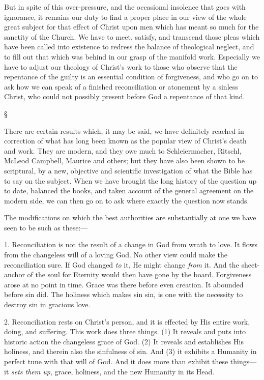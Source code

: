 \documentclass[12pt,letterpaper,oneside]{book}
\begin{document}
But in spite of this over-pressure, and the 
occasional insolence that goes with ignorance, 
it remains our duty to find a proper place in 
our view of the whole great subject for that 
effect of Christ upon men which has meant so 
much for the sanctity of the Church. We have 
to meet, satisfy, and transcend those pleas which 
have been called into existence to redress the 
balance of theological neglect, and to fill out 
that which was behind in our grasp of the 
manifold work. Especially we have to adjust 
our theology of Christ's work to those who 
observe that the repentance of the guilty is an 
essential condition of forgiveness, and who go 
on to ask how we can speak of a finished 
reconciliation or atonement by a sinless Christ, 
who could not possibly present before God a 
repentance of that kind. 

\begin{center}
\S
\end{center}

There are certain results which, it may be 
said, we have definitely reached in correction 
of what has long been known as the popular 
view of Christ's death and work. They are 
modern, and they owe much to Schleiermacher, 
Ritschl, McLeod Campbell, Maurice and others; 
but they have also been shown to be scriptural, 
by a new, objective and scientific investigation 
of what the Bible has to say on the subject. 
When we have brought the long history of 
the question up to date, balanced the books, 
and taken account of the general agreement 
on the modern side, we can then go on to ask 
where exactly the question now stands. 

The modifications on which the best authorities 
are substantially at one we have seen to be 
such as these:--- 

1. Reconciliation is not the result of a change 
in God from wrath to love. It flows from the 
changeless will of a loving God. No other view 
could make the reconciliation sure. If God 
changed \textit{to} it, He might change \textit{from} it. And 
the sheet-anchor of the soul for Eternity would 
then have gone by the board. Forgiveness 
arose at no point in time. Grace was there 
before even creation. It abounded before sin 
did. The holiness which makes sin sin, is one 
with the necessity to destroy sin in gracious 
love. 

2. Reconciliation rests on Christ's person, 
and it is effected by His entire work, doing, and 
suffering. This work does three things. (1) It 
reveals and puts into historic action the changeless 
grace of God. (2) It reveals and establishes 
His holiness, and therein also the sinfulness of 
sin. And (3) it exhibits a Humanity in perfect 
tune with that will of God. And it does more 
than exhibit these things---it \textit{sets them up}, grace, 
holiness, and the new Humanity in its Head. 
\end{document}
